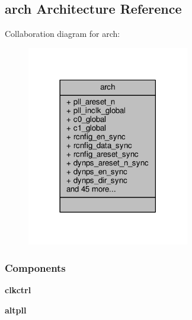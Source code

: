 \subsection{arch Architecture Reference}
\label{classrx__pll__top_1_1arch}


Collaboration diagram for arch\+:\nopagebreak
\begin{figure}[H]
\begin{center}
\leavevmode
\includegraphics[width=201pt]{d1/d08/classrx__pll__top_1_1arch__coll__graph}
\end{center}
\end{figure}
\subsubsection*{Components}
 \begin{DoxyCompactItemize}
\item 
{\bf clkctrl}  {\bfseries }  
\item 
{\bf altpll}  {\bfseries }  
\end{DoxyCompactItemize}
